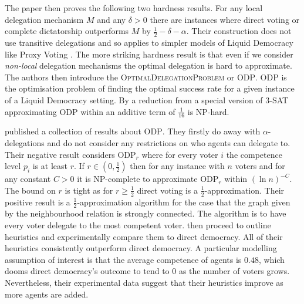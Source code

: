 \documentclass[11pt,a4paper, titlepage]{article}
\theoremstyle{definition}
\begin{document}
The paper then proves the following two hardness results.
For any local delegation mechanism $M$ and any $\delta > 0$ there are instances where direct voting or complete dictatorship outperforms $M$ by $\frac{1}{2} - \delta - \alpha$.
Their construction does not use transitive delegations and so applies to simpler models of Liquid Democracy like Proxy Voting \citet{green2015direct}.
The more striking hardness result is that even if we consider \emph{non-local} delegation mechanisms the optimal delegation is hard to approximate.
The authors then introduce the \textsc{OptimalDelegationProblem} or \textsc{ODP}.
\textsc{ODP} is the optimisation problem of finding the optimal success rate for a given instance of a Liquid Democracy setting.
By a reduction from a special version of \textsc{3-SAT} approximating \textsc{ODP} within an additive term of $\frac{1}{16}$ is NP-hard.

\citet{becker2021can} published a collection of results about \textsc{ODP}. 
They firstly do away with $\alpha$-delegations and do not consider any restrictions on who agents can delegate to.
Their negative result considers \textsc{ODP}$_r$ where for every voter $i$ the competence level $p_i$ is at least  $r$.
If $r \in \left(0, \frac{1}{2} \right)$ then for any instance with $n$ voters and for any constant $C > 0$ it is NP-complete to approximate \textsc{ODP}$_r$ within $(\ln n)^{-C}$.
The bound on $r$ is tight as for $r \geq \frac{1}{2}$ direct voting is a $\frac{1}{2}$-approximation.
Their positive result is a $\frac{1}{2}$-approximation algorithm for the case that the graph given by the neighbourhood relation is strongly connected.
The algorithm is to have every voter delegate to the most competent voter.
\citeauthor{becker2021can} then proceed to outline heuristics and experimentally compare them to direct democracy.
All of their heuristics consistently outperform direct democracy.
A particular modelling assumption of interest is that the average competence of agents is $0.48$, which dooms direct democracy's outcome to tend to 0 as the number of voters grows.
Nevertheless, their experimental data suggest that their heuristics improve as more agents are added.
\end{document}
